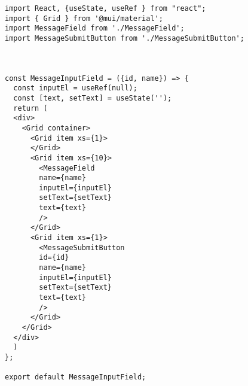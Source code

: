 \begin{verbatim}
import React, {useState, useRef } from "react";
import { Grid } from '@mui/material';
import MessageField from './MessageField';
import MessageSubmitButton from './MessageSubmitButton';



const MessageInputField = ({id, name}) => {
  const inputEl = useRef(null);
  const [text, setText] = useState('');
  return (
  <div>
    <Grid container>
      <Grid item xs={1}>
      </Grid>
      <Grid item xs={10}>
        <MessageField 
        name={name}
        inputEl={inputEl}
        setText={setText} 
        text={text} 
        />
      </Grid>
      <Grid item xs={1}>
        <MessageSubmitButton 
        id={id}
        name={name}
        inputEl={inputEl}
        setText={setText} 
        text={text}
        />
      </Grid>
    </Grid>
  </div>
  )
};

export default MessageInputField;
\end{verbatim}